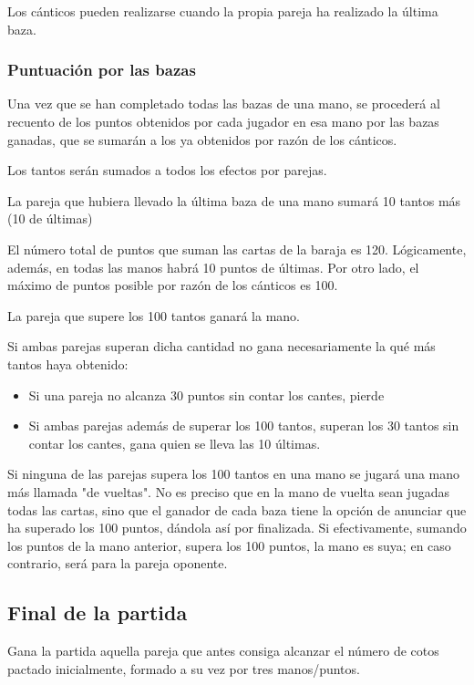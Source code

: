 \documentclass{article}
\begin{document}
Los cánticos pueden realizarse cuando la propia pareja ha realizado la última baza.

\subsubsection*{Puntuación por las bazas}

Una vez que se han completado todas las bazas de una mano, se procederá al recuento de los puntos obtenidos por cada jugador en esa mano por las bazas ganadas, que se sumarán a los ya obtenidos por razón de los cánticos.

Los tantos serán sumados a todos los efectos por parejas.

La pareja que hubiera llevado la última baza de una mano sumará 10 tantos más (10 de últimas)

El número total de puntos que suman las cartas de la baraja es 120. Lógicamente, además, en todas las manos habrá 10 puntos de últimas. Por otro lado, el máximo de puntos posible por razón de los cánticos es 100.

La pareja que supere los 100 tantos ganará la mano.

Si ambas parejas superan dicha cantidad no gana necesariamente la qué más tantos haya obtenido:

\begin{itemize}
	\item Si una pareja no alcanza 30 puntos sin contar los cantes, pierde
	\item Si ambas parejas además de superar los 100 tantos, superan los 30 tantos sin contar los cantes, gana quien se lleva las 10 últimas.
\end{itemize}

Si ninguna de las parejas supera los 100 tantos en una mano se jugará una mano más llamada "de vueltas". No es preciso que en la mano de vuelta sean jugadas todas las cartas, sino que el ganador de cada baza tiene la opción de anunciar que ha superado los 100 puntos, dándola así por finalizada. Si efectivamente, sumando los puntos de la mano anterior, supera los 100 puntos, la mano es suya; en caso contrario, será para la pareja oponente.

\subsection*{Final de la partida}

Gana la partida aquella pareja que antes consiga alcanzar el número de cotos pactado inicialmente, formado a su vez por tres manos/puntos.
\end{document}
